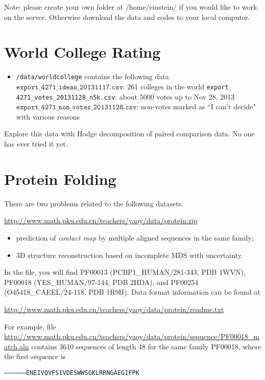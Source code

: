 \documentclass[11pt]{article}
\begin{document}
Note: please create your own folder at /home/einstein/ if you would like to work on the server. Otherwise download the data and codes to your local computer.  

\section{World College Rating} 

\begin{itemize}
\item \texttt{/data/worldcollege} contains the following data
\subitem $\texttt{export$\_$4271\_ideas\_20131117.csv}$: 261 colleges in the world 
\subitem \texttt{export$\_$4271\_votes\_20131128\_n5k.csv}: about 5000 votes up to Nov 28, 2013  
\subitem $\texttt{export\_4271\_non\_votes\_20131128.csv}$: non-votes marked as ``I can't decide" with various reasons 
\end{itemize}

Explore this data with Hodge decomposition of paired comparison data. No one has ever tried it yet. 

\section{Protein Folding}

There are two problems related to the following datasets.

\url{http://www.math.pku.edu.cn/teachers/yaoy/data/protein.zip}

\begin{itemize}
\item prediction of \emph{contact map} by multiple aligned sequences in the same family;
\item 3D structure reconstruction based on incomplete MDS with uncertainty.
\end{itemize}


\noindent In the file, you will find PF00013 (PCBP1\_HUMAN/281-343, PDB 1WVN), PF00018 (YES\_HUMAN/97-144, PDB 2HDA), and PF00254 (O45418\_CAEEL/24-118, PDB 1R9H). Data format information can be found at 

\url{http://www.math.pku.edu.cn/teachers/yaoy/data/protein/readme.txt}

For example, file \url{http://www.math.pku.edu.cn/teachers/yaoy/data/protein/sequence/PF00018\_match.aln} contains 3610 sequences of length 48 for the same family PF00018, where the first sequence is 

{\tt{-----------------ENEIVQVFSIVDESWWSGKLRRNGAEGIFPK}}
\end{document}
